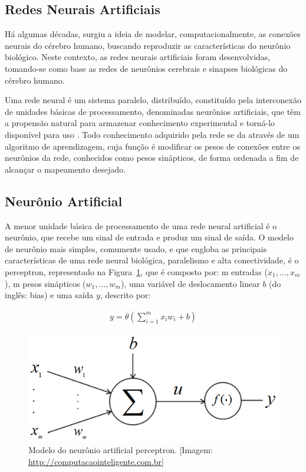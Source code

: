 \subsection{Redes Neurais Artificiais}

Há algumas décadas, surgiu a ideia de modelar, computacionalmente, as conexões neurais do cérebro humano, buscando reproduzir as características do neurônio biológico. Neste contexto, as redes neurais artificiais foram desenvolvidas, tomando-se como base as redes de neurônios cerebrais e sinapses biológicas do cérebro humano.

Uma rede neural é um sistema paralelo, distribuído, constituído pela interconexão de unidades básicas de processamento, denominadas neurônios artificiais, que têm a propensão natural para armazenar conhecimento experimental e torná-lo disponível para uso \cite{haykin2011neural}. Todo conhecimento adquirido pela rede se da através de um algoritmo de aprendizagem, cuja função é modificar os pesos de conexões entre os neurônios da rede, conhecidos como pesos sinápticos, de forma ordenada a fim de alcançar o mapeamento desejado.

\subsection{Neurônio Artificial}

A menor unidade básica de processamento de uma rede neural artificial é o neurônio, que recebe um sinal de entrada e produz um sinal de saída. O modelo de neurônio mais simples, comumente usado, e que engloba as principais características de uma rede neural biológica, paralelismo e alta conectividade, é o perceptron, representado na Figura~\ref{figperceptron}, que é composto por: m entradas (\(x_1, \ldots ,x_m\)), m pesos sinápticos (\(w_1, \ldots , w_m\)), uma variável de deslocamento linear \(b\) (do inglês: bias) e uma saída \(y\), descrito por:

\begin{equation} \label{eqRNA6}
\begin{split}
y = \theta(\sum_{i=1}^{m} x_i w_i + b)
\end{split}
\end{equation}

\begin{figure}[ht]
\centering
\includegraphics[width=.5\textwidth]{figuras/perceptron.png}
\caption{Modelo do neurônio artificial perceptron. [Imagem: \href{ http://computacaointeligente.com.br}{ http://computacaointeligente.com.br}]}
\label{figperceptron}
\end{figure}

